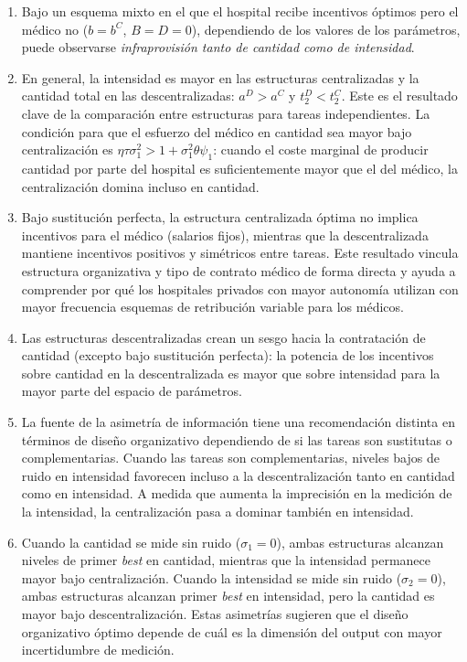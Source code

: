 \documentclass[12pt, a4paper, twoside, openright]{book}
\theoremstyle{plain}
\theoremstyle{definition}
\theoremstyle{remark}
\begin{document}
\begin{enumerate}[label=(\roman*)]
  \item Bajo un esquema mixto en el que el hospital recibe incentivos óptimos pero el médico no ($b=b^C$, $B=D=0$), dependiendo de los valores de los parámetros, puede observarse \textit{infraprovisión tanto de cantidad como de intensidad}.

  \item En general, la intensidad es mayor en las estructuras centralizadas y la cantidad total en las descentralizadas: $a^D>a^C$ y $t_2^D<t_2^C$. Este es el resultado clave de la comparación entre estructuras para tareas independientes. La condición para que el esfuerzo del médico en cantidad sea mayor bajo centralización es $\eta\tau\sigma_1^2>1+\sigma_1^2\theta\psi_1$: cuando el coste marginal de producir cantidad por parte del hospital es suficientemente mayor que el del médico, la centralización domina incluso en cantidad.

  \item Bajo sustitución perfecta, la estructura centralizada óptima no implica incentivos para el médico (salarios fijos), mientras que la descentralizada mantiene incentivos positivos y simétricos entre tareas. Este resultado vincula estructura organizativa y tipo de contrato médico de forma directa y ayuda a comprender por qué los hospitales privados con mayor autonomía utilizan con mayor frecuencia esquemas de retribución variable para los médicos.

  \item Las estructuras descentralizadas crean un sesgo hacia la contratación de cantidad (excepto bajo sustitución perfecta): la potencia de los incentivos sobre cantidad en la descentralizada es mayor que sobre intensidad para la mayor parte del espacio de parámetros.

  \item La fuente de la asimetría de información tiene una recomendación distinta en términos de diseño organizativo dependiendo de si las tareas son sustitutas o complementarias. Cuando las tareas son complementarias, niveles bajos de ruido en intensidad favorecen incluso a la descentralización tanto en cantidad como en intensidad. A medida que aumenta la imprecisión en la medición de la intensidad, la centralización pasa a dominar también en intensidad.

  \item Cuando la cantidad se mide sin ruido ($\sigma_1=0$), ambas estructuras alcanzan niveles de primer \textit{best} en cantidad, mientras que la intensidad permanece mayor bajo centralización. Cuando la intensidad se mide sin ruido ($\sigma_2=0$), ambas estructuras alcanzan primer \textit{best} en intensidad, pero la cantidad es mayor bajo descentralización. Estas asimetrías sugieren que el diseño organizativo óptimo depende de cuál es la dimensión del output con mayor incertidumbre de medición.
\end{enumerate}
\end{document}
